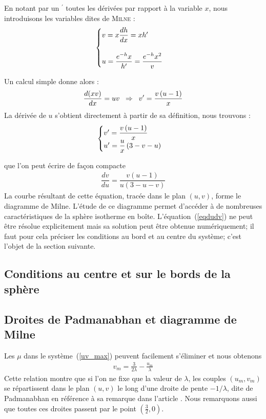 		En notant par un $^\prime$ toutes les dérivées par rapport à la variable $x$, nous introduisons les variables dites de \textsc{Milne :}
		\begin{align}
			\begin{cases}
			v = x \dfrac{d h}{dx} = x h' \\
			\\
			u = \dfrac{e^{-h} x}{h'} = \dfrac{e^{-h} x^2}{v}
		\end{cases}\label{syst_uv}
		\end{align}
		
Un calcul simple donne alors :
\begin{align}
	\dfrac{d(xv)}{dx} = uv \;\;\Rightarrow\;\; v' = \frac{v \left( u - 1\right)}{x} \notag
\end{align}
La dérivée de $u$ s'obtient directement à partir de sa définition, nous trouvons :
	$$\begin{cases}
		v' = \dfrac{v \left( u - 1\right)}{x} \\
		u' = \dfrac{u}{x}\left(3 - v - u\right)
	\end{cases} \label{systdudv}$$
	
	que l'on peut écrire de façon compacte
	\begin{align}
		\dfrac{d v}{d u} = \dfrac{v \left( u - 1\right)}{u \left(3 - u - v\right)}
		\label{eqdudv}
	\end{align}
	La courbe résultant de cette équation, tracée dans le plan $\left(u, v\right)$, forme le diagramme
	de Milne. L'étude de ce diagramme permet d'accéder à de nombreuses caractéristiques de la sphère isotherme en
	boîte. L'équation~(\ref{eqdudv}) ne peut être résolue explicitement mais sa solution peut être obtenue
	numériquement; il faut pour cela préciser les conditions au bord et au centre du système; c'est l'objet de la
	section suivante.
	

\subsection{Conditions au centre et sur le bords de la sphère}
	

\subsection{Droites de Padmanabhan et diagramme de Milne}
	Les $\mu$ dans le système~(\ref{uv_max}) peuvent facilement s'éliminer et nous obtenons
	\begin{align}
		v_m = \frac{3}{2\lambda} - \frac{u_m}{\lambda}\label{droitePb}
	\end{align}
	Cette relation montre que si l'on ne fixe que la valeur de $\lambda$,  les couples $(u_m,v_m)$  se répartissent
	dans le plan $(u,v)$ le long d'une droite de pente $-1/\lambda$, dite de Padmanabhan en référence à sa remarque
	dans l'article \cite{1989ApJS...71..651P}. Nous remarquons aussi que toutes ces droites passent par le point
	$(\frac{3}{2},0)$.
	
